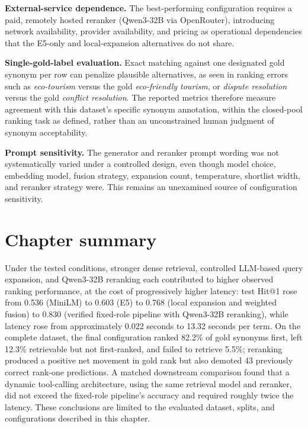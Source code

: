 \textbf{External-service dependence.} The best-performing configuration requires a paid, remotely hosted reranker (Qwen3-32B via OpenRouter), introducing network availability, provider availability, and pricing as operational dependencies that the E5-only and local-expansion alternatives do not share.

\textbf{Single-gold-label evaluation.} Exact matching against one designated gold synonym per row can penalize plausible alternatives, as seen in ranking errors such as \emph{eco-tourism} versus the gold \emph{eco-friendly tourism}, or \emph{dispute resolution} versus the gold \emph{conflict resolution}. The reported metrics therefore measure agreement with this dataset's specific synonym annotation, within the closed-pool ranking task as defined, rather than an unconstrained human judgment of synonym acceptability.

\textbf{Prompt sensitivity.} The generator and reranker prompt wording was not systematically varied under a controlled design, even though model choice, embedding model, fusion strategy, expansion count, temperature, shortlist width, and reranker strategy were. This remains an unexamined source of configuration sensitivity.

\section{Chapter summary}

Under the tested conditions, stronger dense retrieval, controlled LLM-based query expansion, and Qwen3-32B reranking each contributed to higher observed ranking performance, at the cost of progressively higher latency: test Hit@1 rose from 0.536 (MiniLM) to 0.603 (E5) to 0.768 (local expansion and weighted fusion) to 0.830 (verified fixed-role pipeline with Qwen3-32B reranking), while latency rose from approximately 0.022 seconds to 13.32 seconds per term. On the complete dataset, the final configuration ranked 82.2\% of gold synonyms first, left 12.3\% retrievable but not first-ranked, and failed to retrieve 5.5\%; reranking produced a positive net movement in gold rank but also demoted 43 previously correct rank-one predictions. A matched downstream comparison found that a dynamic tool-calling architecture, using the same retrieval model and reranker, did not exceed the fixed-role pipeline's accuracy and required roughly twice the latency. These conclusions are limited to the evaluated dataset, splits, and configurations described in this chapter.

